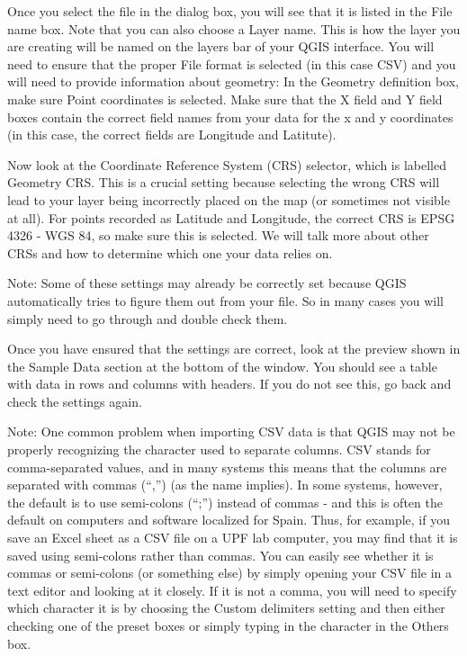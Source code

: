 \documentclass[]{book}
\begin{document}
Once you select the file in the dialog box, you will see that it is listed in the File name box. Note that you can also choose a Layer name. This is how the layer you are creating will be named on the layers bar of your QGIS interface. You will need to ensure that the proper File format is selected (in this case CSV) and you will need to provide information about geometry: In the Geometry definition box, make sure Point coordinates is selected. Make sure that the X field and Y field boxes contain the correct field names from your data for the x and y coordinates (in this case, the correct fields are Longitude and Latitute).

Now look at the Coordinate Reference System (CRS) selector, which is labelled Geometry CRS. This is a crucial setting because selecting the wrong CRS will lead to your layer being incorrectly placed on the map (or sometimes not visible at all). For points recorded as Latitude and Longitude, the correct CRS is EPSG 4326 - WGS 84, so make sure this is selected. We will talk more about other CRSs and how to determine which one your data relies on.

Note: Some of these settings may already be correctly set because QGIS automatically tries to figure them out from your file. So in many cases you will simply need to go through and double check them.

Once you have ensured that the settings are correct, look at the preview shown in the Sample Data section at the bottom of the window. You should see a table with data in rows and columns with headers. If you do not see this, go back and check the settings again.

Note: One common problem when importing CSV data is that QGIS may not be properly recognizing the character used to separate columns. CSV stands for comma-separated values, and in many systems this means that the columns are separated with commas (``,'') (as the name implies). In some systems, however, the default is to use semi-colons (``;'') instead of commas - and this is often the default on computers and software localized for Spain. Thus, for example, if you save an Excel sheet as a CSV file on a UPF lab computer, you may find that it is saved using semi-colons rather than commas. You can easily see whether it is commas or semi-colons (or something else) by simply opening your CSV file in a text editor and looking at it closely. If it is not a comma, you will need to specify which character it is by choosing the Custom delimiters setting and then either checking one of the preset boxes or simply typing in the character in the Others box.
\end{document}
